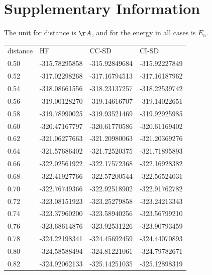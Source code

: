 \section{\textbf{Supplementary Information}}\label{toomuchinformaiton}

The unit for distance is $\AA$, and for the energy in all cases is
$E\mathrm{_h}$.

{\renewcommand{\baselinestretch}{.5}
\scriptsize{
\begin{longtable}{p{} p{} p{} p{}}%
    distance & HF & CC-SD & CI-SD \\
    0.50  & -315.78295858 & -315.92849684 & -315.92227849 \\
    0.52  & -317.02298268 & -317.16794513 & -317.16187962 \\
    0.54  & -318.08661556 & -318.23137257 & -318.22539742 \\
    0.56  & -319.00128270 & -319.14616707 & -319.14022651 \\
    0.58  & -319.78990025 & -319.93521469 & -319.92925985 \\
    0.60  & -320.47167797 & -320.61770586 & -320.61169402 \\
    0.62  & -321.06277663 & -321.20980063 & -321.20369276 \\
    0.64  & -321.57686402 & -321.72520375 & -321.71895893 \\
    0.66  & -322.02561922 & -322.17572368 & -322.16928382 \\
    0.68  & -322.41927766 & -322.57200544 & -322.56524031 \\
    0.70  & -322.76749366 & -322.92518902 & -322.91762782 \\
    0.72  & -323.08151923 & -323.25279858 & -323.24213343 \\
    0.74  & -323.37960200 & -323.58940256 & -323.56799210 \\
    0.76  & -323.68614876 & -323.92531226 & -323.90793459 \\
    0.78  & -324.22198341 & -324.45692459 & -324.44070893 \\
    0.80  & -324.58588494 & -324.81221061 & -324.79782671 \\
    0.82  & -324.92062133 & -325.14251035 & -325.12898319 \\

\end{longtable}}}

